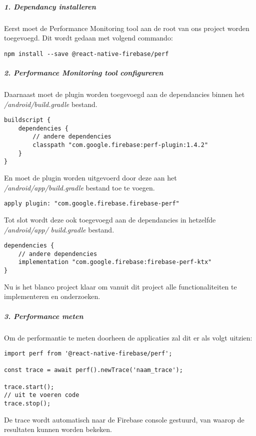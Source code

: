 \subparagraph{1. Dependancy installeren}
Eerst moet de Performance Monitoring tool aan de root van ons project worden toegevoegd. 
Dit wordt gedaan met volgend commando:
\begin{verbatim}
npm install --save @react-native-firebase/perf
\end{verbatim}

\subparagraph{2. Performance Monitoring tool configureren}
Daarnaast moet de plugin worden toegevoegd aan 
de dependancies binnen het \textit{/android/build.gradle} bestand. 
\begin{verbatim}
buildscript {
    dependencies {
        // andere dependencies
        classpath "com.google.firebase:perf-plugin:1.4.2"
    }
}
\end{verbatim}
En moet de plugin worden uitgevoerd door deze aan het \textit{/android/app/build.gradle} bestand toe te voegen.
\begin{verbatim}
apply plugin: "com.google.firebase.firebase-perf"
\end{verbatim}
Tot slot wordt deze ook toegevoegd aan de dependancies in hetzelfde \textit{/android/app/} \textit{build.gradle} bestand.
\begin{verbatim}
dependencies {
    // andere dependencies
    implementation "com.google.firebase:firebase-perf-ktx"
}
\end{verbatim}
Nu is het blanco project klaar om vanuit dit project alle functionaliteiten te 
implementeren en onderzoeken.

\subparagraph{3. Performance meten}
Om de performantie te meten doorheen de applicaties zal dit er als 
volgt uitzien:
\begin{verbatim}
import perf from '@react-native-firebase/perf';

const trace = await perf().newTrace('naam_trace');

trace.start();
// uit te voeren code
trace.stop();

\end{verbatim}
De trace wordt automatisch naar de Firebase console gestuurd, van waarop de 
resultaten kunnen worden bekeken.